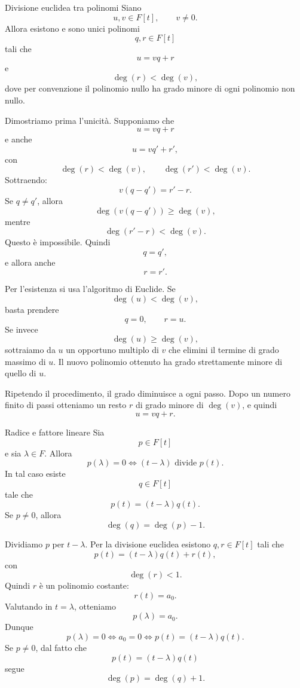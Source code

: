 \documentclass[a4paper]{article}
\begin{document}
\begin{snippettheorem}{Divisione euclidea tra polinomi}
    Siano
    \[
        u,v\in F[t],
        \qquad
        v\neq 0.
    \]
    Allora esistono e sono unici polinomi
    \[
        q,r\in F[t]
    \]
    tali che
    \[
        u=vq+r
    \]
    e
    \[
        \deg(r)<\deg(v),
    \]
    dove per convenzione il polinomio nullo ha grado minore di ogni polinomio non nullo.
\end{snippettheorem}

\begin{snippetproof}{}
    Dimostriamo prima l'unicità. Supponiamo che
    \[
        u=vq+r
    \]
    e anche
    \[
        u=vq'+r',
    \]
    con
    \[
        \deg(r)<\deg(v),
        \qquad
        \deg(r')<\deg(v).
    \]
    Sottraendo:
    \[
        v(q-q')=r'-r.
    \]
    Se \(q\neq q'\), allora
    \[
        \deg(v(q-q'))\geq \deg(v),
    \]
    mentre
    \[
        \deg(r'-r)<\deg(v).
    \]
    Questo è impossibile. Quindi
    \[
        q=q',
    \]
    e allora anche
    \[
        r=r'.
    \]

    Per l'esistenza si usa l'algoritmo di Euclide. Se
    \[
        \deg(u)<\deg(v),
    \]
    basta prendere
    \[
        q=0,
        \qquad
        r=u.
    \]
    Se invece
    \[
        \deg(u)\geq \deg(v),
    \]
    sottraiamo da \(u\) un opportuno multiplo di \(v\) che elimini il termine di grado massimo di \(u\). Il nuovo polinomio ottenuto ha grado strettamente minore di quello di \(u\).

    Ripetendo il procedimento, il grado diminuisce a ogni passo. Dopo un numero finito di passi otteniamo un resto \(r\) di grado minore di \(\deg(v)\), e quindi
    \[
        u=vq+r.
    \]
\end{snippetproof}

\begin{snippetcorollary}{Radice e fattore lineare}
    Sia
    \[
        p\in F[t]
    \]
    e sia \(\lambda\in F\). Allora
    \[
        p(\lambda)=0
        \Longleftrightarrow
        (t-\lambda)\text{ divide }p(t).
    \]
    In tal caso esiste
    \[
        q\in F[t]
    \]
    tale che
    \[
        p(t)=(t-\lambda)q(t).
    \]
    Se \(p\neq 0\), allora
    \[
        \deg(q)=\deg(p)-1.
    \]
\end{snippetcorollary}

\begin{snippetproof}{}
    Dividiamo \(p\) per \(t-\lambda\). Per la divisione euclidea esistono \(q,r\in F[t]\) tali che
    \[
        p(t)=(t-\lambda)q(t)+r(t),
    \]
    con
    \[
        \deg(r)<1.
    \]
    Quindi \(r\) è un polinomio costante:
    \[
        r(t)=a_0.
    \]
    Valutando in \(t=\lambda\), otteniamo
    \[
        p(\lambda)=a_0.
    \]
    Dunque
    \[
        p(\lambda)=0
        \Longleftrightarrow
        a_0=0
        \Longleftrightarrow
        p(t)=(t-\lambda)q(t).
    \]
    Se \(p\neq 0\), dal fatto che
    \[
        p(t)=(t-\lambda)q(t)
    \]
    segue
    \[
        \deg(p)=\deg(q)+1.
    \]
\end{snippetproof}
\end{document}
